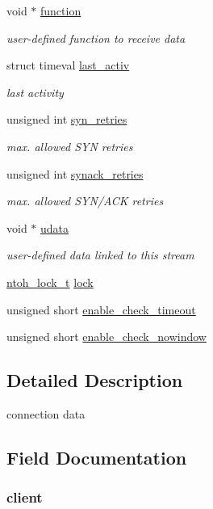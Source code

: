 \begin{DoxyCompactItemize}
void $\ast$ \hyperlink{struct__tcp__stream___aea3dcf0c8de30d192ee92494131c4996}{function}
\begin{DoxyCompactList}\small\item\em user-\/defined function to receive data \end{DoxyCompactList}\item 
struct timeval \hyperlink{struct__tcp__stream___a9d115049a50ba4e69eb04c23c973a4a2}{last\-\_\-activ}
\begin{DoxyCompactList}\small\item\em last activity \end{DoxyCompactList}\item 
unsigned int \hyperlink{struct__tcp__stream___ac9513bdb8bd827b1cb22798ae852ba13}{syn\-\_\-retries}
\begin{DoxyCompactList}\small\item\em max. allowed S\-Y\-N retries \end{DoxyCompactList}\item 
unsigned int \hyperlink{struct__tcp__stream___ab971226b37668b378effb81aeba6a63c}{synack\-\_\-retries}
\begin{DoxyCompactList}\small\item\em max. allowed S\-Y\-N/\-A\-C\-K retries \end{DoxyCompactList}\item 
void $\ast$ \hyperlink{struct__tcp__stream___a697ce711b67313990d351b5c95f87aed}{udata}
\begin{DoxyCompactList}\small\item\em user-\/defined data linked to this stream \end{DoxyCompactList}\item 
\hyperlink{structntoh__lock__t}{ntoh\-\_\-lock\-\_\-t} \hyperlink{struct__tcp__stream___aad15823e4f2835531e6a02321cd53f7e}{lock}
\item 
unsigned short \hyperlink{struct__tcp__stream___a23b5d0e5ed45fe6d2771469b246eaa42}{enable\-\_\-check\-\_\-timeout}
\item 
unsigned short \hyperlink{struct__tcp__stream___a5a1f60051aef79a9ac2d6d89ac996da1}{enable\-\_\-check\-\_\-nowindow}
\end{DoxyCompactItemize}


\subsection{Detailed Description}
connection data 

\subsection{Field Documentation}
\hypertarget{struct__tcp__stream___a1a9f72c5f58a3583f2a54d176e51de0c}{
\subsubsection[{client}]{ client}}\label{struct__tcp__stream___a1a9f72c5f58a3583f2a54d176e51de0c}


